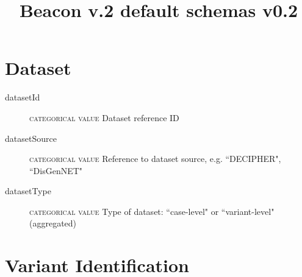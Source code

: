 \documentclass[a4paper, 10pt]{article}        %
\begin{document}
\title{Beacon v.2 default schemas v0.2}
\date{} %
\maketitle





 \section*{{\color{teal}Dataset}}
 \begin{description}
  	\item[datasetId] {\textsc{categorical value}} Dataset reference ID
	\item[datasetSource] {\textsc{categorical value}} Reference to dataset source, e.g. ``DECIPHER", ``DisGenNET"
	\item[datasetType] {\textsc{categorical value}} Type of dataset: ``case-level" or ``variant-level" (aggregated)  
  \end{description}


\section*{{\color{teal}Variant Identification}}

\end{document}
